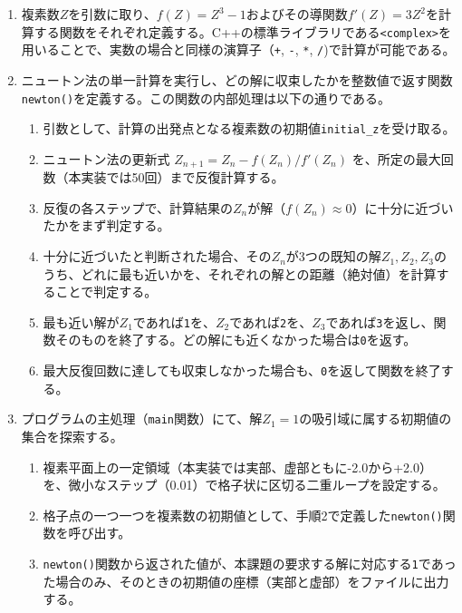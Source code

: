 \documentclass[dvipdfmx,a4paper]{jsarticle}
\newcommand{\code}[1]{\colorbox{inlinebackcolour}{\lstinline|#1|}}
\begin{document}
\begin{enumerate}
    \item 複素数$Z$を引数に取り、$f(Z)=Z^3-1$およびその導関数$f'(Z)=3Z^2$を計算する関数をそれぞれ定義する。C++の標準ライブラリである\code{<complex>}を用いることで、実数の場合と同様の演算子（\code{+}, \code{-}, \code{*}, \code{/})で計算が可能である。

    \item ニュートン法の単一計算を実行し、どの解に収束したかを整数値で返す関数\code{newton()}を定義する。この関数の内部処理は以下の通りである。
    \begin{enumerate}
        \item 引数として、計算の出発点となる複素数の初期値\code{initial_z}を受け取る。
        \item ニュートン法の更新式 $Z_{n+1} = Z_n - f(Z_n)/f'(Z_n)$ を、所定の最大回数（本実装では50回）まで反復計算する。
        \item 反復の各ステップで、計算結果の$Z_n$が解（$f(Z_n) \approx 0$）に十分に近づいたかをまず判定する。
        \item 十分に近づいたと判断された場合、その$Z_n$が3つの既知の解$Z_1, Z_2, Z_3$のうち、どれに最も近いかを、それぞれの解との距離（絶対値）を計算することで判定する。
        \item 最も近い解が$Z_1$であれば\code{1}を、$Z_2$であれば\code{2}を、$Z_3$であれば\code{3}を返し、関数そのものを終了する。どの解にも近くなかった場合は\code{0}を返す。
        \item 最大反復回数に達しても収束しなかった場合も、\code{0}を返して関数を終了する。
    \end{enumerate}

    \item プログラムの主処理（\code{main}関数）にて、解$Z_1=1$の吸引域に属する初期値の集合を探索する。
    \begin{enumerate}
        \item 複素平面上の一定領域（本実装では実部、虚部ともに-2.0から+2.0）を、微小なステップ（0.01）で格子状に区切る二重ループを設定する。
        \item 格子点の一つ一つを複素数の初期値として、手順2で定義した\code{newton()}関数を呼び出す。
        \item \code{newton()}関数から返された値が、本課題の要求する解に対応する\code{1}であった場合のみ、そのときの初期値の座標（実部と虚部）をファイルに出力する。
    \end{enumerate}
\end{enumerate}
\end{document}
